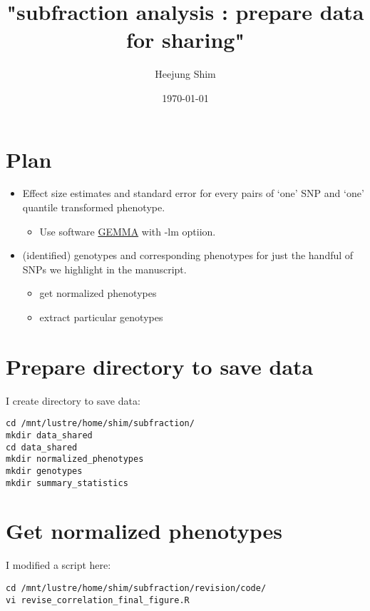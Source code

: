 \documentclass[11pt]{article}
\author{Heejung Shim}
\date{\today}
\title{"subfraction analysis : prepare data for sharing"}
\begin{document}
\maketitle
\tableofcontents


\section{Plan}
\label{sec-1}
\begin{itemize}
\item Effect size estimates and standard error for every pairs of `one' SNP and `one' quantile transformed phenotype.
\begin{itemize}
\item Use software \href{http://www.xzlab.org/software.html}{GEMMA} with -lm optiion.
\end{itemize}
\item (identified) genotypes and corresponding phenotypes for just the handful of SNPs we highlight in the manuscript.
\begin{itemize}
\item get normalized phenotypes
\item extract particular genotypes
\end{itemize}
\end{itemize}
\section{Prepare directory to save data}
\label{sec-2}
I create directory to save data:
\begin{lstlisting}
cd /mnt/lustre/home/shim/subfraction/
mkdir data_shared
cd data_shared
mkdir normalized_phenotypes
mkdir genotypes
mkdir summary_statistics
\end{lstlisting}

\section{Get normalized phenotypes}
\label{sec-3}
I modified a script here:
\begin{lstlisting}
cd /mnt/lustre/home/shim/subfraction/revision/code/
vi revise_correlation_final_figure.R
\end{lstlisting}
\end{document}
